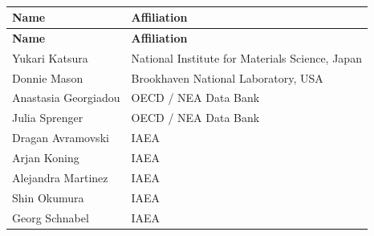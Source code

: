 \begin{center}
{\normalfont\bfseries\fontsize{14pt}{16pt}\selectfont
\meetingsubject\\}
\meetingdate
\end{center}

\begin{longtable}{@{}p{4.5cm}p{\dimexpr\textwidth-4.5cm-2\tabcolsep\relax}@{}}
\toprule
\textbf{Name} & \textbf{Affiliation} \\
\midrule
\endfirsthead
\toprule
\textbf{Name} & \textbf{Affiliation} \\
\midrule
\endhead
\bottomrule
\endlastfoot

Yukari Katsura & National Institute for Materials Science, Japan \\
Donnie Mason & Brookhaven National Laboratory, USA \\
Anastasia Georgiadou & OECD / NEA Data Bank \\
Julia Sprenger & OECD / NEA Data Bank \\
Dragan Avramovski & IAEA\\
Arjan Koning & IAEA\\
Alejandra Martinez & IAEA\\
Shin Okumura & IAEA\\
Georg Schnabel & IAEA\\
\end{longtable}
